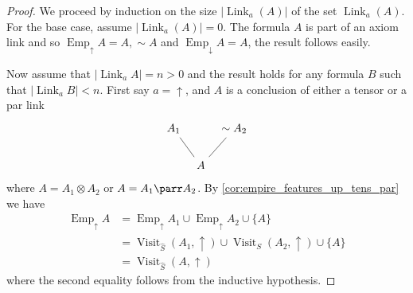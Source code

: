\documentclass[12pt]{article}
\theoremstyle{plain}
\theoremstyle{definition}
\newcommand{\negation}{\sim}
\begin{document}
	\begin{proof}
		We proceed by induction on the size $|\operatorname{Link}_a(A)|$ of the set $\operatorname{Link}_a(A)$. For the base case, assume $|\operatorname{Link}_a(A)| = 0$. The formula $A$ is part of an axiom link and so $\operatorname{Emp}_{\uparrow}A = A, \negation A$ and $\operatorname{Emp}_{\downarrow}A = A$, the result follows easily.
		
		Now assume that $|\operatorname{Link}_a A| = n > 0$ and the result holds for any formula $B$ such that $|\operatorname{Link}_aB| < n$. First say $a = \uparrow$, and $A$ is a conclusion of either a tensor or a par link
		\[
		\begin{tikzcd}[column sep = tiny]
			A_1\arrow[dr,dash] && \negation A_2\arrow[dl,dash]\\
			& A
		\end{tikzcd}
		\]
		where $A = A_1 \otimes A_2$ or $A = A_1 \parr A_2$. By \eqref{cor:empire_features_up_tens_par} we have
		\begin{align*}
			\operatorname{Emp}_{\uparrow}A &= \operatorname{Emp}_{\uparrow}A_1 \cup \operatorname{Emp}_{\uparrow}A_2 \cup \lbrace A\rbrace\\
			&= \operatorname{Visit}_{\hat{S}}(A_1,\uparrow) \cup \operatorname{Visit}_S(A_2,\uparrow) \cup \lbrace A \rbrace\\
			&= \operatorname{Visit}_{\hat{S}}(A, \uparrow)
		\end{align*}
		where the second equality follows from the inductive hypothesis.
		

\end{proof}
\end{document}
